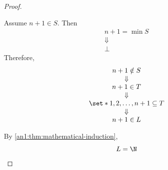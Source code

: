 \begin{proof}
\begin{itemize}
\[          \]
          Assume $n + 1 \in S$. Then
          \[
            \begin{array}{c}
              n + 1 = \min S \\
              \Downarrow     \\
              \bot
            \end{array}
          \]
          Therefore,
          \[
            \begin{array}{c}
              n + 1 \notin S                        \\
              \Downarrow                            \\
              n + 1 \in T                           \\
              \Downarrow                            \\
              \set*{1, 2, \dots, n + 1} \subseteq T \\
              \Downarrow                            \\
              n + 1 \in L
            \end{array}
          \]
  \end{itemize}
  By \cref{an1:thm:mathematical-induction},
  \[
    L = \N
  \]
\end{proof}
